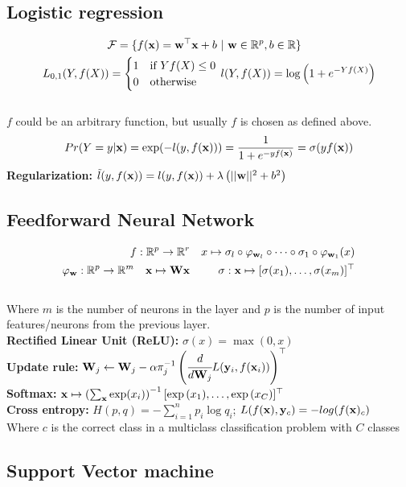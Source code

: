 %
\begin{mdframed}[style=eqbox]
\subsection{Logistic regression}
\vspace*{-6pt}\begin{align*}
  \mathcal{F} = \{f(\mathbf{x}) = \mathbf{w}^\top \mathbf{x} + b &~\vert~ \mathbf{w} \in \mathbb R^p, b \in \mathbb R\}\\
  L_{0,1}(Y, f(X)) = \begin{cases}
    1 & \text{if } Y f(X) \leq 0\\
    0 & \text{otherwise}
  \end{cases}&~
  l(Y, f(X)) = \log \left(1 + e^{-Y f(X)}\right)
\end{align*}\vspace*{-12pt}\\
\small{$f$ could be an arbitrary function, but usually $f$ is chosen as defined above.}
\begin{align*}
  Pr(Y = y \vert \mathbf{x}) = \exp( - l(y, f(\mathbf{x}))) = \frac{1}{1 + e^{-y f(\mathbf{x})}} = \sigma(y f(\mathbf{x}))
\end{align*}
\textbf{Regularization:} $\tilde{l}(y, f(\mathbf{x})) = l(y, f(\mathbf{x})) + \lambda \left(\vert\vert \mathbf{w} \vert\vert^2 + b^2\right)$
\end{mdframed}
%
\begin{mdframed}[style=eqbox]
\subsection{Feedforward Neural Network}
\vspace*{-6pt}\begin{align*}
  f: \mathbb{R}^p \to \mathbb R^r && x \mapsto \sigma_l \circ \varphi_{\mathbf{w}_l} \circ \cdots \circ \sigma_1 \circ \varphi_{\mathbf{w}_1}(x)\\
  \varphi_{\mathbf{w}}: \mathbb R^p \to \mathbb R^m \quad \mathbf{x} \mapsto \mathbf{W} \mathbf{x} && \sigma: \mathbf{x} \mapsto [\sigma(x_1), \ldots, \sigma(x_m)]^\top
\end{align*}\vspace*{-14pt}\\
\small{Where $m$ is the number of neurons in the layer and $p$ is the number of input features/neurons from the previous layer.}\\
\textbf{Rectified Linear Unit (ReLU):} $\sigma(x) = \max(0, x)$\\
\textbf{Update rule:} $\mathbf{W}_{j} \gets \mathbf{W}_{j} - \alpha \pi_j^{-1}\left( \cfrac{d}{d \mathbf{W}_j} L(\mathbf{y}_i, f(\mathbf{x}_i))\right)^\top$\\
\textbf{Softmax:} $\mathbf{x} \mapsto \left(\sum_{\mathbf{x}} \exp(x_i)\right)^{-1} [\exp{(x_1)}, \ldots, \exp{(x_C)}]^\top$\\
\textbf{Cross entropy:} $H(p,q) = -\sum_{i=1}^{n} p_i \log q_i$; $L(f(\mathbf{x}), \mathbf{y}_c) = - log(f(\mathbf{x})_c)$\\[0.25em]
\small{Where $c$ is the correct class in a multiclass classification problem with $C$ classes}
\end{mdframed}
%
\begin{mdframed}[style=eqbox]
\subsection{Support Vector machine}
\end{mdframed}